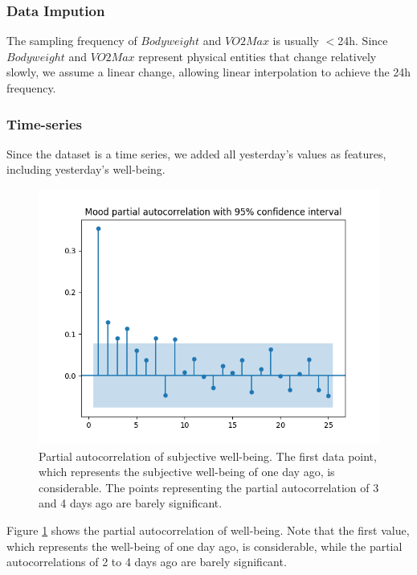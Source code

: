 \documentclass[conference]{IEEEtran}
\begin{document}
\subsubsection{Data Impution}
The sampling frequency of $Bodyweight$ and $VO2Max$ is usually $<$24h.
Since $Bodyweight$ and $VO2Max$ represent physical entities that change relatively slowly, we assume a linear change, allowing linear interpolation to achieve the 24h frequency.

\subsubsection{Time-series} 
\label{sec:time-series}
Since the dataset is a time series, we added all yesterday's values as features, including yesterday's well-being.

\begin{figure}[htbp]
\begin{center}
\includegraphics[width=1\linewidth]{figs/partial_autocorrelation_025lags_Mood.png}
\caption[Partial autocorrelation]{Partial autocorrelation of subjective well-being. The first data point, which represents the subjective well-being of one day ago, is considerable. The points representing the partial autocorrelation of 3 and 4 days ago are barely significant.}
\label{fig:partial_auto_corr}
\end{center}
\end{figure}


Figure \ref{fig:partial_auto_corr} shows the partial autocorrelation of well-being. Note that the first value, which represents the well-being of one day ago, is considerable, while the partial autocorrelations of 2 to 4 days ago are barely significant.
\end{document}
